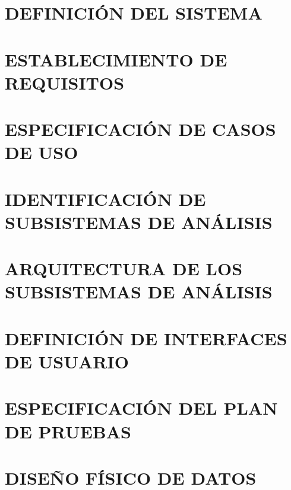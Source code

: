 \section{DEFINICIÓN DEL SISTEMA}



\newpage
\section{ESTABLECIMIENTO DE REQUISITOS}


\newpage
\section{ESPECIFICACIÓN DE CASOS DE USO}


\newpage
\section{IDENTIFICACIÓN DE SUBSISTEMAS DE ANÁLISIS}



\newpage
\section{ARQUITECTURA DE LOS SUBSISTEMAS DE ANÁLISIS}



\newpage
\section{DEFINICIÓN DE INTERFACES DE USUARIO}



\newpage
\section{ESPECIFICACIÓN DEL PLAN DE PRUEBAS}


\newpage
\section{DISEÑO FÍSICO DE DATOS}
